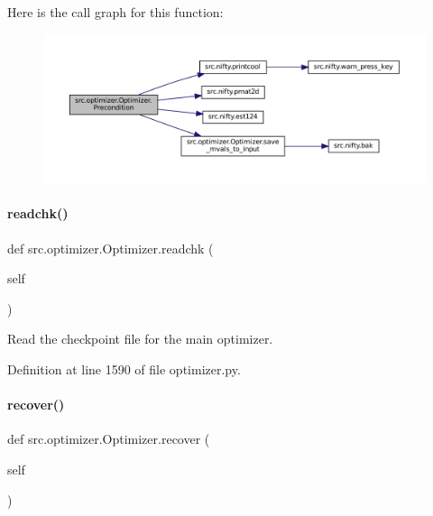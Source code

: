 Here is the call graph for this function\+:
\nopagebreak
\begin{figure}[H]
\begin{center}
\leavevmode
\includegraphics[width=350pt]{classsrc_1_1optimizer_1_1Optimizer_a372e02cecc05914c0fea61baf5ea2b28_cgraph}
\end{center}
\end{figure}
\mbox{\label{classsrc_1_1optimizer_1_1Optimizer_ab57aa047acdc3aedfbe0f292c80e3d18}} 
\paragraph{\texorpdfstring{readchk()}{readchk()}}
{\footnotesize\ttfamily def src.\+optimizer.\+Optimizer.\+readchk (\begin{DoxyParamCaption}\item[{}]{self }\end{DoxyParamCaption})}



Read the checkpoint file for the main optimizer. 



Definition at line 1590 of file optimizer.\+py.

\mbox{\label{classsrc_1_1optimizer_1_1Optimizer_af63201bdb35965f56f59d1c2a859e9d1}} 
\paragraph{\texorpdfstring{recover()}{recover()}}
{\footnotesize\ttfamily def src.\+optimizer.\+Optimizer.\+recover (\begin{DoxyParamCaption}\item[{}]{self }\end{DoxyParamCaption})}



